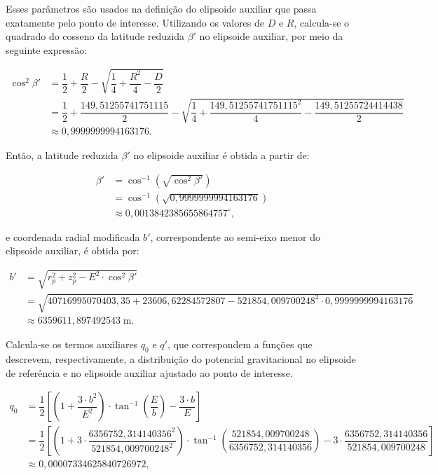 \noindent
Esses parâmetros são usados na definição do elipsoide auxiliar que passa exatamente pelo ponto de interesse. Utilizando os valores de \(D\) e \(R\), calcula-se o quadrado do cosseno da latitude reduzida \(\beta'\) no elipsoide auxiliar, por meio da seguinte expressão:

\[
\begin{aligned}
\cos^2 \beta' &= \dfrac{1}{2} + \dfrac{R}{2} - \sqrt{ \dfrac{1}{4} + \dfrac{R^2}{4} - \dfrac{D}{2} } \\
              &= \dfrac{1}{2} + \dfrac{149{,}51255741751115}{2} - \sqrt{ \dfrac{1}{4} + \dfrac{149{,}51255741751115^2}{4} - \dfrac{149{,}51255724414438}{2} } \\
              &\approx 0{,}9999999994163176 \text{.}
\end{aligned}
\]

\noindent
Então, a latitude reduzida \(\beta'\) no elipsoide auxiliar é obtida a partir de:

\[
\begin{aligned}
   \beta' &= \cos^{-1}\left( \sqrt{\cos^2 \beta'} \right) \\
          &= \cos^{-1}\left( \sqrt{0{,}9999999994163176} \right) \\
          &\approx 0{,}0013842385655864757^\circ \text{,}
\end{aligned}
\]

\noindent
e coordenada radial modificada \(b'\), correspondente ao semi-eixo menor do elipsoide auxiliar, é obtida por:



\[
\begin{aligned}
   b' &= \sqrt{r_p^2 + z_p^2 - E^2 \cdot \cos^2 \beta'} \\
      &= \sqrt{40716995070403{,}35 + 23606{,}62284572807 - 521854{,}009700248^2 \cdot 0{,}9999999994163176} \\
     &\approx 6359611{,}897492543 \; \text{m} \text{.}
\end{aligned}
\]

\noindent
Calcula-se os termos auxiliares \(q_0\) e \(q'\), que correspondem a funções que descrevem, respectivamente, a distribuição do potencial gravitacional no elipsoide de referência e no elipsoide auxiliar ajustado ao ponto de interesse.




\[
\begin{aligned}
   q_0
   &= \dfrac{1}{2} \left[\left(1 + \dfrac{3 \cdot b^2}{E^2}\right) \cdot \tan^{-1}\!\left(\dfrac{E}{b}\right) - \dfrac{3 \cdot b}{E}\right]\\
   &= \dfrac{1}{2} \left[\left(1 + 3 \cdot \dfrac{6356752{,}314140356^2}{521854{,}009700248^2}\right) \cdot \tan^{-1}\!\left(\dfrac{521854{,}009700248}{6356752{,}314140356}\right) - 3 \cdot \dfrac{6356752{,}314140356}{521854{,}009700248}\right]\\
   &\approx 0{,}00007334625840726972 \text{,}
\end{aligned}
\]


